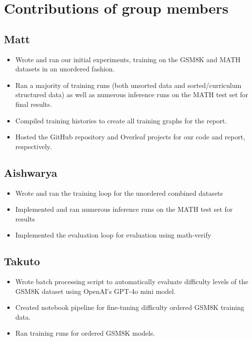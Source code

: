 \section{Contributions of group members}

\subsection{Matt}

\begin{itemize}
    \item Wrote and ran our initial experiments, training on the GSM8K and MATH datasets in an unordered fashion.
    \item Ran a majority of training runs (both unsorted data and sorted/curriculum structured data) as well as numerous inference runs on the MATH test set for final results.
    \item Compiled training histories to create all training graphs for the report.
    \item Hosted the GitHub repository and Overleaf projects for our code and report, respectively. 
\end{itemize}

\subsection{Aishwarya}
\begin{itemize}
    \item Wrote and ran the training loop for the unordered combined datasets 
    \item Implemented and ran numerous inference runs on the MATH test set for results 
    \item Implemented the evaluation loop for evaluation using math-verify
\end{itemize}
\subsection{Takuto}

\begin{itemize}
    \item Wrote batch processing script to automatically evaluate difficulty levels of the GSM8K dataset using OpenAI's GPT-4o mini model.
    \item Created notebook pipeline for fine-tuning difficulty ordered GSM8K training data.
    \item Ran training runs for ordered GSM8K models.
\end{itemize}

